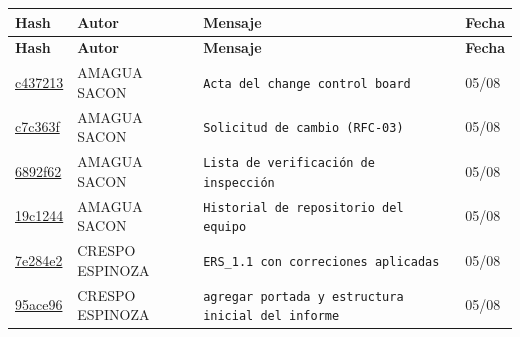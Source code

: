 \documentclass[11pt,a4paper]{article}
\begin{document}



\begin{longtable}{|p{1.9cm}|p{2.4cm}|p{7.6cm}|p{1.3cm}|}
\hline
\textbf{Hash} & \textbf{Autor} & \textbf{Mensaje} & \textbf{Fecha} \\
\hline
\endfirsthead
\hline
\textbf{Hash} & \textbf{Autor} & \textbf{Mensaje} & \textbf{Fecha} \\
\hline
\endhead

\href{https://github.com/EdhuXav/EdhuXav-ISR401-PFC-ERS-EquipoJ/commit/c437213c0d1da9abdd44871672bff4945f27310f}{c437213}
& AMAGUA SACON & \texttt{Acta del change control board} & 05/08 \\ \hline

\href{https://github.com/EdhuXav/EdhuXav-ISR401-PFC-ERS-EquipoJ/commit/c7c363f22843f600ff22ffb8beb7fa5ed4f77b15}{c7c363f}
& AMAGUA SACON & \texttt{Solicitud de cambio (RFC-03)} & 05/08 \\ \hline

\href{https://github.com/EdhuXav/EdhuXav-ISR401-PFC-ERS-EquipoJ/commit/6892f62fda6ca8eb4e9aec33f815803b929a9a15}{6892f62}
& AMAGUA SACON & \texttt{Lista de verificación de inspección} & 05/08 \\ \hline

\href{https://github.com/EdhuXav/EdhuXav-ISR401-PFC-ERS-EquipoJ/commit/19c1244942ba7038db9b0056869f8674b80b3109}{19c1244}
& AMAGUA SACON & \texttt{Historial de repositorio del equipo} & 05/08 \\ \hline

\href{https://github.com/EdhuXav/EdhuXav-ISR401-PFC-ERS-EquipoJ/commit/7e284e269feef571803f143900a366c540e4aa7d}{7e284e2}
& CRESPO ESPINOZA & \texttt{ERS\_1.1 con correciones aplicadas} & 05/08 \\ \hline

\href{https://github.com/EdhuXav/EdhuXav-ISR401-PFC-ERS-EquipoJ/commit/95ace964af80886ad5c0f4728dcd50d6ea75be68}{95ace96}
& CRESPO ESPINOZA & \texttt{agregar portada y estructura inicial del informe} & 05/08 \\ \hline


\end{longtable}
\end{document}
